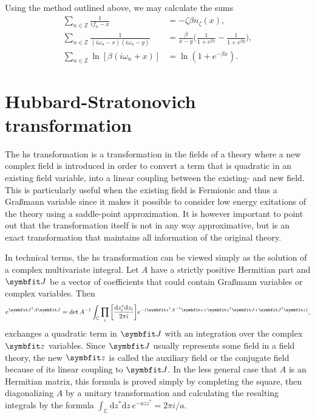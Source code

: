 Using the method outlined above, we may calculate the sums
\begin{subequations}
    \label{eq:Field:Mats:sums}
    \begin{align}
        \label{eq:Field:mats:sums:singlePole}
        \sum_{n\in\mathbb{Z}}\frac{1}{if_n-x} &= -\zeta\beta n_\zeta(x),\\
        \sum_{n\in\mathbb{Z}}\frac{1}{(i\omega_n - x)(i\omega_n - y)} &= \frac{\beta}{x-y}\bigg(\frac{1}{1+e^{\beta x}} - \frac{1}{1+e^{\beta y}}\bigg),\label{eq:Field:Mats:sums:twoPoles}\\
        \sum_{n\in\mathbb{Z}}\ln[\beta(i\omega_n + x)] &= \ln(1+e^{-\beta x}).\label{eq:Field:Mats:sums:ln}
    \end{align}
\end{subequations}

\section{Hubbard-Stratonovich transformation}

The \ac{hs} transformation is a transformation in the fields of a theory where a new complex field is introduced
in order to convert a term that is quadratic in an existing field variable, into a linear coupling between
the existing- and new field. This is particularly useful when the existing field is Fermionic and thus
a Gra\ss mann variable since it makes it possible to consider low energy exitations of the theory using \eg a saddle-point
approximation. It is however important to point out that the transformation itself is not in any way approximative, but is
an exact transformation that maintains all information of the original theory.

In technical terms, the \ac{hs} transformation can be viewed simply as the solution of a complex multivariate integral.
Let $A$ have a strictly positive Hermitian part and $\v{J}$ be a vector of
coefficients that could contain Gra\ss mann variables or complex variables. Then
\begin{equation}
    \label{eq:Field:HS:complexIntegral}
    e^{\v{J}^\dagger A \v{J}} = \det A^{-1}\int_{\mathbb{C}}\prod_{i}\bigg[\frac{\mathrm{d}z_i^\ast\mathrm{d}z_i}{2\pi i}\bigg]e^{-(\v{z}^\dagger A^{-1}\v{z} + \v{z}^\dagger \v{J} + \v{J}^\dagger\v{z})},
\end{equation}
exchanges a quadratic term in $\v{J}$ with an integration over the complex $\v{z}$ variables.
Since $\v{J}$ usually represents some field in a field theory, the new $\v{z}$ is called the auxiliary field or the conjugate
field because of its linear coupling to $\v{J}$.
In the less general case that $A$ is an Hermitian matrix, this formula is proved simply by completing the square, then
diagonalizing $A$ by a unitary transformation and calculating the resulting integrals by the formula 
$\int_{\mathbb{C}}\!\mathrm{d}z^\ast\mathrm{d}z\,e^{-azz^\ast} = 2\pi i /a$. 

